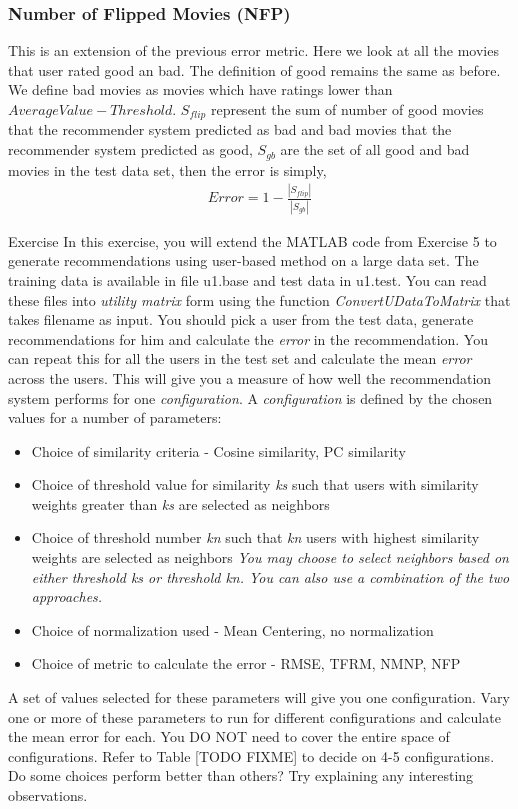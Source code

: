   \subsubsection{Number of Flipped Movies (NFP)}
  This is an extension of the previous error metric. Here we look at all the movies that user rated good an bad. The definition of good remains the same as before. We define bad movies as movies which have ratings lower than $AverageValue - Threshold$. $S_{flip}$ represent the sum of number of good movies that the recommender system predicted as bad and bad movies that the recommender system predicted as good, $S_{gb}$ are the set of all good and bad movies in the test data set, then the error is simply, 
  \begin{align*}
  Error = 1 - \frac{|S_{flip}|}{|S_{gb}|}
  \end{align*}

\begin{myremark}{Exercise }
In this exercise, you will extend the MATLAB code from Exercise 5 to generate recommendations using user-based method on a large data set. The training data is available in file u1.base and test data in u1.test. You can read these files into \textit{utility matrix} form using the function \textit{ConvertUDataToMatrix} that takes filename as input. You should pick a user from the test data, generate recommendations for him and calculate the \textit{error} in the recommendation. You can repeat this for all the users in the test set and calculate the mean \textit{error} across the users. This will give you a measure of how well the recommendation system performs for one \textit{configuration}.
A \textit{configuration} is defined by the chosen values for a number of parameters:
\begin{itemize}
\item{}Choice of similarity criteria - Cosine similarity, PC similarity
\item{}Choice of threshold value for similarity \textit{ks} such that users with similarity weights greater than \textit{ks} are selected as neighbors
\item{}Choice of threshold number \textit{kn} such that \textit{kn} users with highest similarity weights are selected as neighbors 
\textit{You may choose to select neighbors based on either threshold ks or threshold kn. You can also use a combination of the two approaches.}
\item{}Choice of normalization used - Mean Centering, no normalization
\item{}Choice of metric to calculate the error - RMSE, TFRM, NMNP, NFP
\end{itemize}
A set of values selected for these parameters will give you one configuration. Vary one or more of these parameters to run for different configurations and calculate the mean error for each. You DO NOT need to cover the entire space of configurations. Refer to Table [TODO FIXME] to decide on 4-5 configurations. Do some choices perform better than others? Try explaining any interesting observations.
\end{myremark}
